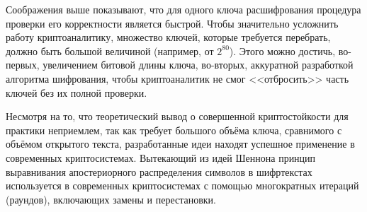 Соображения выше показывают, что для одного ключа расшифрования процедура проверки его корректности является быстрой. Чтобы значительно усложнить работу криптоаналитику, множество ключей, которые требуется перебрать, должно быть большой величиной (например, от $2^{80}$). Этого можно достичь, во-первых, увеличением битовой длины ключа, во-вторых, аккуратной разработкой алгоритма шифрования, чтобы криптоаналитик не смог <<отбросить>> часть ключей без их полной проверки.

Несмотря на то, что теоретический вывод о совершенной криптостойкости для практики неприемлем, так как требует большого объёма ключа, сравнимого с объёмом открытого текста, разработанные идеи находят успешное применение в современных криптосистемах. Вытекающий из идей Шеннона принцип выравнивания апостериорного распределения символов в шифртекстах используется в современных криптосистемах с помощью многократных итераций (раундов), включающих замены и перестановки.
